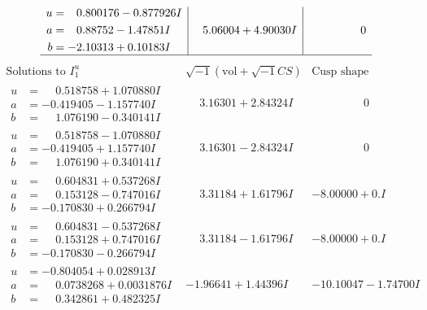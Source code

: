 \documentclass[1p]{elsarticle_modified}
\theoremstyle{definition}
\newcommand{\I}{\sqrt{-1}}
\begin{document}
$$\begin{array}{c|c|c}
\begin{aligned}
u &= \phantom{-}0.800176 - 0.877926 I \\
a &= \phantom{-}0.88752 - 1.47851 I \\
b &= -2.10313 + 0.10183 I\end{aligned}
 & \phantom{-}5.06004 + 4.90030 I & \phantom{-0.000000 } 0\\
 \hline 
 \end{array}$$\newpage$$\begin{array}{c|c|c}  
\text{Solutions to }I^u_{1}& \I (\text{vol} + \sqrt{-1}CS) & \text{Cusp shape}\\
 \hline 
\begin{aligned}
u &= \phantom{-}0.518758 + 1.070880 I \\
a &= -0.419405 - 1.157740 I \\
b &= \phantom{-}1.076190 - 0.340141 I\end{aligned}
 & \phantom{-}3.16301 + 2.84324 I & \phantom{-0.000000 } 0 \\ \hline\begin{aligned}
u &= \phantom{-}0.518758 - 1.070880 I \\
a &= -0.419405 + 1.157740 I \\
b &= \phantom{-}1.076190 + 0.340141 I\end{aligned}
 & \phantom{-}3.16301 - 2.84324 I & \phantom{-0.000000 } 0 \\ \hline\begin{aligned}
u &= \phantom{-}0.604831 + 0.537268 I \\
a &= \phantom{-}0.153128 - 0.747016 I \\
b &= -0.170830 + 0.266794 I\end{aligned}
 & \phantom{-}3.31184 + 1.61796 I & -8.00000 + 0. I\phantom{ +0.000000I} \\ \hline\begin{aligned}
u &= \phantom{-}0.604831 - 0.537268 I \\
a &= \phantom{-}0.153128 + 0.747016 I \\
b &= -0.170830 - 0.266794 I\end{aligned}
 & \phantom{-}3.31184 - 1.61796 I & -8.00000 + 0. I\phantom{ +0.000000I} \\ \hline\begin{aligned}
u &= -0.804054 + 0.028913 I \\
a &= \phantom{-}0.0738268 + 0.0031876 I \\
b &= \phantom{-}0.342861 + 0.482325 I\end{aligned}
 & -1.96641 + 1.44396 I & -10.10047 - 1.74700 I \\ \hline\begin{aligned}

\end{aligned}
\end{array}$$
\end{document}
